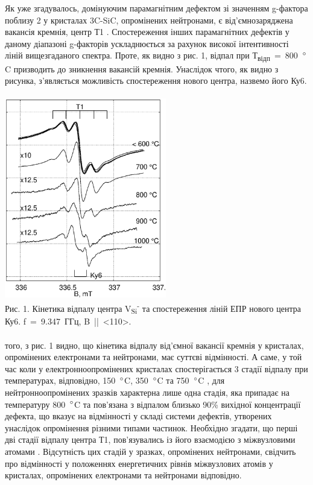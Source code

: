 Як уже згадувалось, домінуючим парамагнітним дефектом зі значенням \mbox{g-фактора} поблизу 2 у кристалах 3C-SiC, опромінених нейтронами, є від'ємнозаряджена вакансія кремнія, центр Т1 \citep{t1}. Спостереження інших парамагнітних дефектів у даному діапазоні \mbox{g-факторів} ускладнюється за рахунок високої інтентивності ліній вищезгаданого спектра. Проте, як видно з рис. 1, відпал при Т\textsubscript{відп}~=~800~$\degree$C призводить до зникнення вакансій кремнія. Унаслідок чтого, як видно з рисунка, з'являється можливість спостереження нового центра, назвемо його Ку6.\\
\\
\includegraphics[width=200pt]{images/g1.eps}\mbox{}\\
\small Рис. 1. Кінетика відпалу центра V\textsubscript{Si}\textsuperscript{-} та спостереження ліній ЕПР нового центра Ку6. f~=~9.347~ГГц, B~||~<110>.\\
\\
\normalsize
{} того, з рис. 1 видно, що кінетика відпалу від'ємної вакансії кремнія у кристалах, опромінених електронами та нейтронами, має суттєві відмінності. А саме, у той час коли у електронноопромінених кристалах спостерігається 3 стадії відпалу при температурах, відповідно, 150~$\degree$C, 350~$\degree$C та 750~$\degree$C \citep{t1}, для нейтронноопромінених зразків характерна лише одна стадія, яка припадає на температуру 800~$\degree$C та пов'язана з відпалом близько 90\% вихідної концентрації дефекта, що вказує на відмінності у складі системи дефектів, утворених унаслідок опромінення різними типами частинок. Необхідно згадати, що перші дві стадії відпалу центра Т1, пов'язувались із його взаємодією з міжвузловими атомами \citep{t1}. Відсутність цих стадій у зразках, опромінених нейтронами, свідчить про відмінності у положеннях енергетичних рівнів міжвузлових атомів у кристалах, опромінених електронами та нейтронами відповідно.\\
